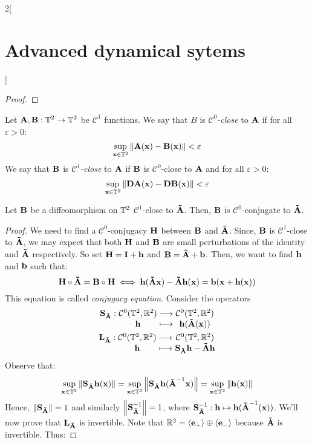 \documentclass[../../../main_math.tex]{subfiles}
\begin{document}
\begin{multicols}{2}[\section{Advanced dynamical sytems}]
\begin{proof}
  \end{proof}
  \begin{definition}
    Let $\vf{A},\vf{B}:\TT^2\rightarrow \TT^2$ be $\mathcal{C}^1$ functions. We say that $B$ is \emph{$\mathcal{C}^0$-close} to $\vf{A}$ if for all $\varepsilon>0$:
    $$
      \sup_{\vf{x}\in \TT^2}\norm{\vf{A}(\vf{x})-\vf{B}(\vf{x})}<\varepsilon
    $$
    We say that $\vf{B}$ is \emph{$\mathcal{C}^1$-close} to $\vf{A}$ if $\vf{B}$ is $\mathcal{C}^0$-close to $\vf{A}$ and for all $\varepsilon>0$:
    $$
      \sup_{\vf{x}\in \TT^2}\norm{\vf{D}\vf{A}(\vf{x})-\vf{D}\vf{B}(\vf{x})}<\varepsilon
    $$
  \end{definition}
  \begin{theorem}
    Let $\vf{B}$ be a diffeomorphism on $\TT^2$ $\mathcal{C}^1$-close to $\vf{\tilde{A}}$. Then, $\vf{B}$ is $\mathcal{C}^0$-conjugate to $\vf{\tilde{A}}$.
  \end{theorem}
  \begin{proof}
    We need to find a $\mathcal{C}^0$-conjugacy $\vf{H}$ between $\vf{B}$ and $\vf{\tilde{A}}$. Since, $\vf{B}$ is $\mathcal{C}^1$-close to $\vf{\tilde{A}}$, we may expect that both $\vf{H}$ and $\vf{B}$ are small perturbations of the identity and $\vf{\tilde{A}}$ respectively. So set $\vf{H}=\vf{I}+\vf{h}$ and $\vf{B}=\vf{\tilde{A}}+\vf{b}$. Then, we want to find $\vf{h}$ and $\vf{b}$ such that:
    $$
      \vf{H}\circ \vf{\tilde{A}}=\vf{B}\circ \vf{H}\iff
      \vf{h}(\vf{\tilde{A}x})-\vf{\tilde{A}} \vf{h}(\vf{x})=\vf{b}(\vf{x}+\vf{h}(\vf{x}))
    $$
    This equation is called \emph{conjugacy equation}. Consider the operators
    \begin{gather*}
      \function{\vf{S}_{\vf{\tilde{A}}}}{\mathcal{C}^0(\TT^2,\RR^2)}{\mathcal{C}^0(\TT^2,\RR^2)}{\vf{h}}{\vf{h}(\vf{\tilde{A}}(\vf{x}))}\\
      \function{\vf{L}_{\vf{\tilde{A}}}}{\mathcal{C}^0(\TT^2,\RR^2)}{\mathcal{C}^0(\TT^2,\RR^2)}{\vf{h}}{\vf{S}_{\vf{\tilde{A}}}\vf{h}-\vf{\tilde{A}}\vf{h}}
    \end{gather*}
    Observe that:
    $$
      \sup_{\vf{x}\in \TT^2}\norm{\vf{S}_{\vf{\tilde{A}}}\vf{h}(\vf{x})}=\sup_{\vf{x}\in \TT^2}\norm{\vf{S}_{\vf{\tilde{A}}}\vf{h}(\vf{\tilde{A}}^{-1}\vf{x})}= \sup_{\vf{x}\in \TT^2}\norm{\vf{h}(\vf{x})}
    $$
    Hence, $\norm{\vf{S}_{\vf{\tilde{A}}}}=1$ and similarly $\norm{\vf{S}_{\vf{\tilde{A}}}^{-1}}=1$, where $\vf{S}_{\vf{\tilde{A}}}^{-1}:\vf{h}\mapsto \vf{h}(\vf{\tilde{A}}^{-1}(\vf{x}))$. We'll now prove that $\vf{L}_{\vf{\tilde{A}}}$ is invertible. Note that $\RR^2=\langle \vf{e}_+\rangle \oplus \langle \vf{e}_-\rangle$ because $\vf{\tilde{A}}$ is invertible. Thus:

\end{proof}
\end{multicols}
\end{document}
